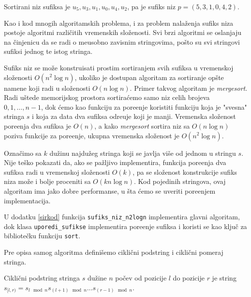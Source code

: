 Sortirani niz sufiksa je $u_5, u_3, u_1, u_0, u_4, u_2$, pa je sufiks niz $p = (5,3,1,0,4,2)$.


Kao i kod mnogih algoritamskih problema, i za problem nala\v zenja sufiks niza postoje algoritmi razli\v citih vremenskih slo\v zenosti. Svi brzi algoritmi se oslanjaju na \v cinjenicu da se radi o me\dj usobno zavisnim stringovima, po\v sto su svi stringovi sufiksi jednog te istog stringa.


Sufiks niz se mo\v ze konstruisati prostim sortiranjem svih sufiksa u vremenskoj slo\v zenosti $O(n^2 \log n)$, ukoliko je dostupan algoritam za sortiranje op\v ste namene koji radi u slo\v zenosti $O(n \log n)$. Primer takvog algoritam je \textit{mergesort}. Radi u\v stede memorijskog prostora sortira\' cemo samo niz celih brojeva $0,1,\ldots,n-1$, dok \' cemo kao funkciju za pore\dj enje koristiti funkciju koja je "svesna" stringa $s$ i koja za data dva sufiksa odre\dj uje koji je manji. Vremenska slo\v zenost pore\dj enja dva sufiksa je $O(n)$, a kako \textit{mergesort} sortira niz sa $O(n \log n)$ poziva funkcije za pore\dj enje, ukupna vremenska slo\v zenost je $O(n^2 \log n)$.

Ozna\v cimo sa $k$ du\v zinu najdu\v zeg stringa koji se javlja vi\v se od jednom u stringu $s$. Nije te\v sko pokazati da, ako se pa\v zljivo implementira, funkcija pore\dj enja dva sufiksa radi u vremenskoj slo\v zenosti $O(k)$, pa se slo\v zenost konstrukcije sufiks niza mo\v ze i bolje proceniti sa $O(kn \log n)$. Kod pojedinih stringova, ovaj algoritam ima jako dobre performanse, u \v sta \' cemo se uveriti pore\dj enjem implementacija.

U dodatku \ref{sirkod} funkcija \texttt{sufiks\_niz\_n2logn} implementira glavni algoritam, dok klasa \texttt{uporedi\_sufikse} implementira pore\dj enje sufiksa i koristi se kao klju\v c za bibliote\v cku funkciju \texttt{sort}.


Pre opisa samog algoritma defini\v semo cikli\v cni podstring i cikli\v cni pomeraj stringa.

\begin{dfn}
Cikli\v cni podstring stringa $s$ du\v zine $n$ po\v cev od pozicije $l$ do pozicije $r$ je string $s_{[l, r)} = s_{l \mod n}s_{(l+1)\mod n}\ldots s_{(r-1)\mod n}$.
\end{dfn}

